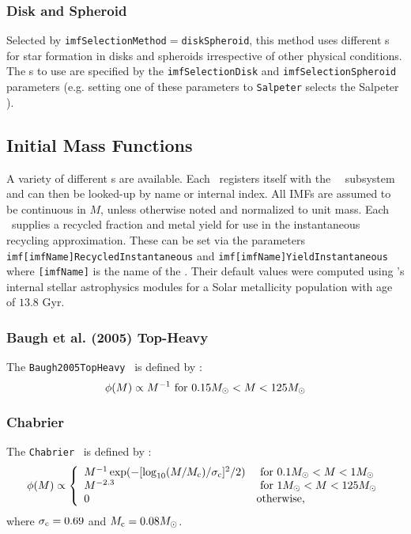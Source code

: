 \subsubsection{Disk and Spheroid}

Selected by {\tt imfSelectionMethod}$=${\tt diskSpheroid}, this method uses different {\IMF}s for star formation in disks and spheroids irrespective of other physical conditions. The {\IMF}s to use are specified by the {\tt imfSelectionDisk} and {\tt imfSelectionSpheroid} parameters (e.g. setting one of these parameters to {\tt Salpeter} selects the Salpeter \IMF).

\subsection{Initial Mass Functions}\label{sec:physicsIMF}

A variety of different \IMF s are available. Each \IMF\ registers itself with the \glc\ \IMF\ subsystem and can then be looked-up by name or internal index. All IMFs are assumed to be continuous in $M$, unless otherwise noted and normalized to unit mass. Each \IMF\ supplies a recycled fraction and metal yield for use in the instantaneous recycling approximation. These can be set via the parameters {\tt imf[imfName]RecycledInstantaneous} and {\tt imf[imfName]YieldInstantaneous} where {\tt [imfName]} is the name of the \IMF. Their default values were computed using \glc 's internal stellar astrophysics modules for a Solar metallicity population with age of $13.8$ Gyr.

\subsubsection{Baugh et al. (2005) Top-Heavy}

The {\tt Baugh2005TopHeavy} \IMF\ is defined by \citep{baugh_can_2005}:
\begin{equation}
 \phi(M) \propto 
 M^{-1} \hbox{ for } 0.15M_\odot < M < 125M_\odot
\end{equation}

\subsubsection{Chabrier}

The {\tt Chabrier} \IMF\ is defined by \citep{chabrier_galactic_2001}:
\begin{equation}
 \phi(M) \propto \left\{ \begin{array}{ll}
 M^{-1} \exp(-[\log_{10}(M/M_{\rm c})/\sigma_{\rm c}]^2/2) & \hbox{ for } 0.1M_\odot < M < 1M_\odot \\
 M^{-2.3} & \hbox{ for } 1M_\odot < M < 125M_\odot \\
 0 & \hbox {otherwise,} \end{array} \right.
\end{equation}
where $\sigma_{\rm c}=0.69$ and $M_{\rm c}=0.08M_\odot$.

